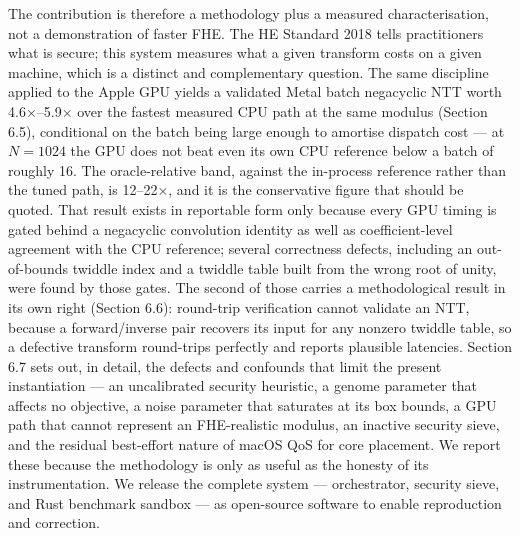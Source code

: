 The contribution is therefore a methodology plus a measured characterisation, not a demonstration of faster FHE. The HE Standard 2018 tells practitioners what is secure; this system measures what a given transform costs on a given machine, which is a distinct and complementary question. The same discipline applied to the Apple GPU yields a validated Metal batch negacyclic NTT worth 4.6×--5.9× over the fastest measured CPU path at the same modulus (Section 6.5), conditional on the batch being large enough to amortise dispatch cost --- at \(N = 1024\) the GPU does not beat even its own CPU reference below a batch of roughly 16. The oracle-relative band, against the in-process reference rather than the tuned path, is 12--22×, and it is the conservative figure that should be quoted. That result exists in reportable form only because every GPU timing is gated behind a negacyclic convolution identity as well as coefficient-level agreement with the CPU reference; several correctness defects, including an out-of-bounds twiddle index and a twiddle table built from the wrong root of unity, were found by those gates. The second of those carries a methodological result in its own right (Section 6.6): round-trip verification cannot validate an NTT, because a forward/inverse pair recovers its input for any nonzero twiddle table, so a defective transform round-trips perfectly and reports plausible latencies. Section 6.7 sets out, in detail, the defects and confounds that limit the present instantiation --- an uncalibrated security heuristic, a genome parameter that affects no objective, a noise parameter that saturates at its box bounds, a GPU path that cannot represent an FHE-realistic modulus, an inactive security sieve, and the residual best-effort nature of macOS QoS for core placement. We report these because the methodology is only as useful as the honesty of its instrumentation. We release the complete system --- orchestrator, security sieve, and Rust benchmark sandbox --- as open-source software to enable reproduction and correction.

